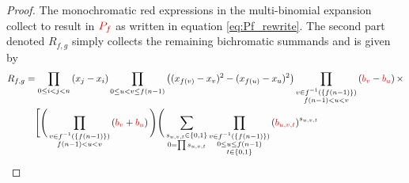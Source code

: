 \begin{proof}
The monochromatic red expressions in the multi-binomial expansion collect to result in ${\color{red}P_{f}}$ as written in equation \eqref{eq:Pf_rewrite}.
The second part denoted $R_{f,g}$ simply collects the remaining bichromatic
summands and is given by
\[
\begin{aligned}
R_{f,g} &= \prod_{0 \leq i < j < n} \left( x_j - x_i \right) 
\prod_{0 \leq u < v \leq f(n-1)} 
\left( (x_{f(v)} - x_v)^2 - (x_{f(u)} - x_u)^2 \right) 
\prod_{\substack{v \in f^{-1}(\{ f(n-1) \}) \\ f(n-1) < u < v}} 
\left( {\color{red} b_v} - {\color{red} b_u} \right) \times \\ 
& \quad 
\Bigg[ 
\Bigg(
\prod_{\substack{v \in f^{-1}(\{ f(n-1) \}) \\ f(n-1) < u < v}} 
\left( {\color{red} b_v} + {\color{red} b_u} \right)
\Bigg)
\Bigg(
\sum_{\substack{s_{u,v,t} \in \{0,1\} \\ 0 = \prod s_{u,v,t}}} 
\prod_{\substack{v \in f^{-1}(\{ f(n-1) \}) \\ 0 \leq u \leq f(n-1) \\ t \in \{0,1\}}} 
\left( {\color{red} b_{u,v,t}} \right)^{s_{u,v,t}} 

\end{aligned}\]
\end{proof}
